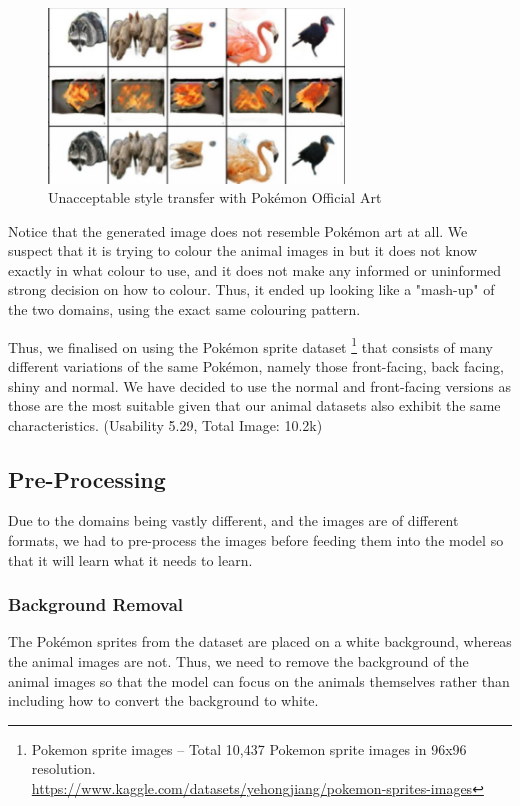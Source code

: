 \documentclass[twoside,english,notitlepage]{report}
\begin{document}
\begin{figure}[h]
    \centering
    \includegraphics[width=0.7\textwidth]{task2/poke-fail1.jpg}
    \vspace{-10pt}
    \caption{Unacceptable style transfer with Pokémon Official Art}\label{fig:poke-fail1}
\end{figure}

\noindent Notice that the generated image does not resemble Pokémon art at all. We suspect that it is trying to colour the animal images in but it does not know exactly in what colour to use, and it does not make any informed or uninformed strong decision on how to colour. Thus, it ended up looking like a "mash-up" of the two domains, using the exact same colouring pattern. 

\noindent Thus, we finalised on using the Pokémon sprite dataset \footnote{Pokemon sprite images – Total 10,437 Pokemon sprite images in 96x96 resolution. \\ \href{https://www.kaggle.com/datasets/yehongjiang/pokemon-sprites-images}{https://www.kaggle.com/datasets/yehongjiang/pokemon-sprites-images}} that consists of many different variations of the same Pokémon, namely those front-facing, back facing, shiny and normal. We have decided to use the normal and front-facing versions as those are the most suitable given that our animal datasets also exhibit the same characteristics. (Usability 5.29, Total Image: 10.2k)

\subsection{Pre-Processing}\label{task2:preprocess}
Due to the domains being vastly different, and the images are of different formats, we had to pre-process the images before feeding them into the model so that it will learn what it needs to learn. 
\subsubsection{Background Removal}
The Pokémon sprites from the dataset are placed on a white background, whereas the animal images are not. Thus, we need to remove the background of the animal images so that the model can focus on the animals themselves rather than including how to convert the background to white. \\
\end{document}

